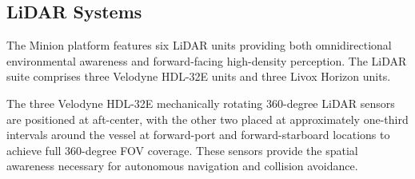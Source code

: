 

\subsection{LiDAR Systems} \label{sensors_LiDAR}

The Minion platform features six \ac{LiDAR} units providing both omnidirectional environmental awareness and forward-facing high-density perception.
The \ac{LiDAR} suite comprises three Velodyne HDL-32E units and three Livox Horizon units.

The three Velodyne HDL-32E mechanically rotating 360-degree \ac{LiDAR} sensors are positioned at aft-center, with the other two placed at approximately one-third intervals around the vessel at forward-port and forward-starboard locations to achieve full 360-degree \ac{FOV} coverage.
These sensors provide the spatial awareness necessary for autonomous navigation and collision avoidance.

